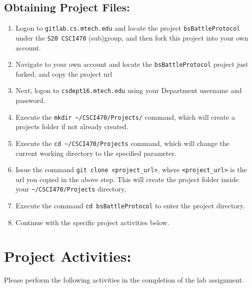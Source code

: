 \documentclass[10pt]{article}
\begin{document}
\newpage
\subsection*{Obtaining Project Files:}

   \begin{enumerate}
      \item Logon to \verb|gitlab.cs.mtech.edu| and locate the project \verb|bsBattleProtocol| under the \verb|S20 CSCI470| (sub)group, and then fork this project into your own account.
      \item Navigate to your own account and locate the \verb|bsBattleProtocol| project  just forked, and copy the project url
      \item Next, logon to \verb|csdept16.mtech.edu| using your Department username and password. 
      \item Execute the \verb|mkdir ~/CSCI470/Projects/| command, which will create a projects folder if not already created.
      \item Execute the \verb|cd ~/CSCI470/Projects| command, which will change the current working directory to the specified parameter. 
      \item Issue the command \verb|git clone <project_url>|, where \verb|<project_url>| is the url you copied in the above step. This will create the project folder inside your \verb|~/CSCI470/Projects| directory,
      \item Execute the command \verb|cd bsBattleProtocol| to enter the project directory.
      \item Continue with the specific project activities below.
   \end{enumerate}

\section*{Project Activities:}

Please perform the following activities in the completion of the lab assignment.
\end{document}
